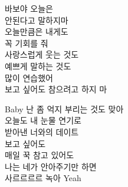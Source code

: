 \documentclass{oblivoir}
\begin{document}
\begin{center} %
\noindent 바보야 오늘은\\ %
안된다고 말하지마\\
오늘만큼은 내게도\\
꼭 기회를 줘\\
사랑스럽게 웃는 것도\\
예쁘게 말하는 것도\\
많이 연습했어\\
보고 싶어도 참으려고 하지 마\\
\vspace{10pt} %

\noindent Baby 난 좀 억지 부리는 것도 맞아\\
오늘도 내 눈물 연기로\\
받아낸 너와의 데이트\\
보고 싶어도\\
매일 꾹 참고 있어도\\
나는 네가 안아주기만 하면\\
사르르르르 녹아 Yeah \\
\end{center}
\end{document}
